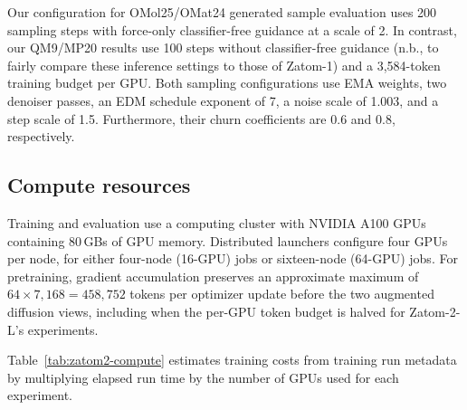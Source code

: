 \documentclass{article} %
\begin{document}
Our configuration for OMol25/OMat24 generated sample evaluation uses 200 sampling steps with force-only classifier-free guidance at a scale of 2. In contrast, our QM9/MP20 results use 100 steps without classifier-free guidance (n.b., to fairly compare these inference settings to those of Zatom-1) and a 3,584-token training budget per GPU. Both sampling configurations use EMA weights, two denoiser passes, an EDM schedule exponent of 7, a noise scale of 1.003, and a step scale of 1.5. Furthermore, their churn coefficients are 0.6 and 0.8, respectively.

\subsection{Compute resources}
\label{app:compute-resources}

Training and evaluation use a computing cluster with NVIDIA
A100 GPUs containing 80\,GBs of GPU memory. Distributed launchers
configure four GPUs per node, for either four-node (16-GPU) jobs or sixteen-node
(64-GPU) jobs. For pretraining, gradient accumulation preserves
an approximate maximum of $64\times7{,}168=458{,}752$ tokens per optimizer
update before the two augmented diffusion views, including when the per-GPU token budget is halved for Zatom-2-L's experiments.

Table~\ref{tab:zatom2-compute} estimates training costs from training run metadata by multiplying elapsed run time by the number of GPUs used for each experiment.
\end{document}
